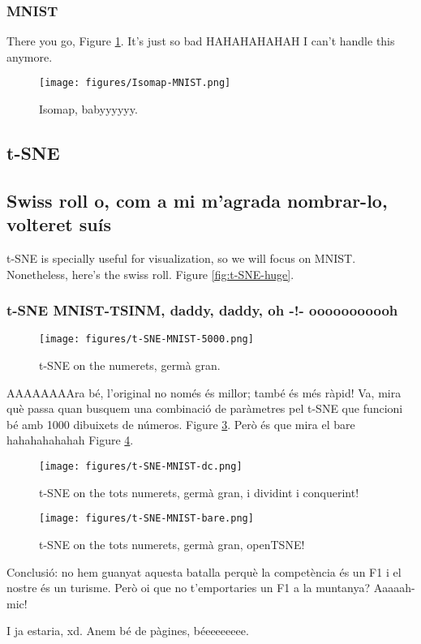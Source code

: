 \subsubsection{MNIST}

There you go, Figure \ref{fig:Isomap-MNIST}. It's just so bad HAHAHAHAHAH I can't handle this anymore.

\begin{figure}[ht]
    \centering
    \texttt{[image: figures/Isomap-MNIST.png]}
    \caption{Isomap, babyyyyyy.}
    \label{fig:Isomap-MNIST}
\end{figure}

\subsection{t-SNE}

\subsection{Swiss roll o, com a mi m'agrada nombrar-lo, volteret suís}

t-SNE is specially useful for visualization, so we will focus on MNIST. Nonetheless, here's the swiss roll. Figure \ref{fig:t-SNE-huge}.

\subsubsection{t-SNE MNIST-TSINM, daddy, daddy, oh -!- ooooooooooh}

\begin{figure}[ht]
    \centering
    \texttt{[image: figures/t-SNE-MNIST-5000.png]}
    \caption{t-SNE on the numerets, germà gran.}
    \label{fig:t-SNE-MNIST}
\end{figure}

AAAAAAAAra bé, l'original no només és millor; també és més ràpid! Va, mira què passa quan busquem una combinació de paràmetres pel t-SNE que funcioni bé amb 1000 dibuixets de números. Figure \ref{fig:t-SNE-MNIST-dc}. Però és que mira el bare hahahahahahah Figure \ref{fig:t-SNE-MNIST-bare}.

\begin{figure}[ht]
    \centering
    \texttt{[image: figures/t-SNE-MNIST-dc.png]}
    \caption{t-SNE on the tots numerets, germà gran, i dividint i conquerint!}
    \label{fig:t-SNE-MNIST-dc}
\end{figure}

\begin{figure}[ht]
    \centering
    \texttt{[image: figures/t-SNE-MNIST-bare.png]}
    \caption{t-SNE on the tots numerets, germà gran, openTSNE!}
    \label{fig:t-SNE-MNIST-bare}
\end{figure}

Conclusió: no hem guanyat aquesta batalla perquè la competència és un F1 i el nostre és un turisme. Però oi que no t'emportaries un F1 a la muntanya? Aaaaah-mic!

I ja estaria, xd. Anem bé de pàgines, béeeeeeeee.